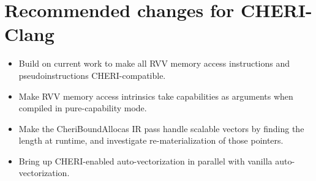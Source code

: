 \section{Recommended changes for CHERI-Clang}\label{chap:software:sec:chericlangchanges}
\begin{itemize}
    \item Build on current work to make all RVV memory access instructions and pseudoinstructions CHERI-compatible.
    \item Make RVV memory access intrinsics take capabilities as arguments when compiled in pure-capability mode.
    \item Make the CheriBoundAllocas IR pass handle scalable vectors by finding the length at runtime, and investigate re-materialization of those pointers.
    \item Bring up CHERI-enabled auto-vectorization in parallel with vanilla auto-vectorization.
\end{itemize}
